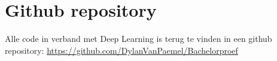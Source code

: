 \section{Github repository} %

Alle code in verband met Deep Learning is terug te vinden in een github repository: \url{https://github.com/DylanVanPaemel/Bachelorproef}